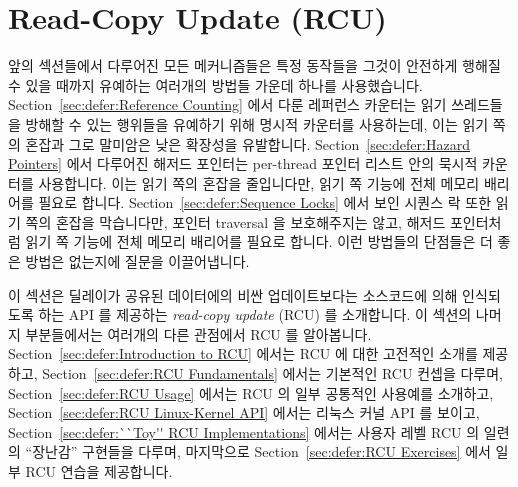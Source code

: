
\section{Read-Copy Update (RCU)}
\label{sec:defer:Read-Copy Update (RCU)}

앞의 섹션들에서 다루어진 모든 메커니즘들은 특정 동작들을 그것이 안전하게 행해질
수 있을 때까지 유예하는 여러개의 방법들 가운데 하나를 사용했습니다.
Section~\ref{sec:defer:Reference Counting} 에서 다룬 레퍼런스 카운터는 읽기
쓰레드들을 방해할 수 있는 행위들을 유예하기 위해 명시적 카운터를 사용하는데,
이는 읽기 쪽의 혼잡과 그로 말미암은 낮은 확장성을 유발합니다.
Section~\ref{sec:defer:Hazard Pointers} 에서 다루어진 해저드 포인터는
per-thread 포인터 리스트 안의 묵시적 카운터를 사용합니다.
이는 읽기 쪽의 혼잡을 줄입니다만, 읽기 쪽 기능에 전체 메모리 배리어를 필요로
합니다.
Section~\ref{sec:defer:Sequence Locks} 에서 보인 시퀀스 락 또한 읽기 쪽의
혼잡을 막습니다만, 포인터 traversal 을 보호해주지는 않고, 해저드 포인터처럼
읽기 쪽 기능에 전체 메모리 배리어를 필요로 합니다.
이런 방법들의 단점들은 더 좋은 방법은 없는지에 질문을 이끌어냅니다.
\iffalse

All of the mechanisms discussed in the preceding sections
used one of a number of approaches to defer specific actions
until they may be carried out safely.
The reference counters discussed in
Section~\ref{sec:defer:Reference Counting}
use explicit counters to defer actions that could disturb readers,
which results in read-side contention and thus poor scalability.
The hazard pointers covered by
Section~\ref{sec:defer:Hazard Pointers}
uses implicit counters in the guise of per-thread lists of pointer.
This avoids read-side contention, but requires
full memory barriers in read-side primitives.
The sequence lock presented in
Section~\ref{sec:defer:Sequence Locks}
also avoids read-side contention, but does not protect pointer
traversals and, like hazard pointers, requires full memory barriers
in read-side primitives.
These schemes' shortcomings raise the question of
whether it is possible to do better.
\fi

이 섹션은 딜레이가 공유된 데이터에의 비싼 업데이트보다는 소스코드에 의해
인식되도록 하는 API 를 제공하는 \emph{read-copy update} (RCU) 를 소개합니다.
이 섹션의 나머지 부분들에서는 여러개의 다른 관점에서 RCU 를 알아봅니다.
Section~\ref{sec:defer:Introduction to RCU} 에서는 RCU 에 대한 고전적인 소개를
제공하고,
Section~\ref{sec:defer:RCU Fundamentals} 에서는 기본적인 RCU 컨셉을 다루며,
Section~\ref{sec:defer:RCU Usage} 에서는 RCU 의 일부 공통적인 사용예를
소개하고,
Section~\ref{sec:defer:RCU Linux-Kernel API} 에서는 리눅스 커널 API 를 보이고,
Section~\ref{sec:defer:``Toy'' RCU Implementations} 에서는 사용자 레벨 RCU 의
일련의 ``장난감'' 구현들을 다루며, 마지막으로
Section~\ref{sec:defer:RCU Exercises} 에서 일부 RCU 연습을 제공합니다.
\iffalse


